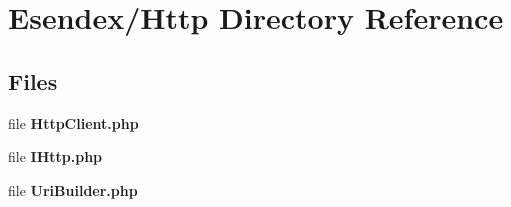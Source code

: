 \section{Esendex/\-Http Directory Reference}
\label{dir_b59bf127e7c1bcef4ca1e517d6fc1685}
\subsection*{Files}
\begin{DoxyCompactItemize}
\item 
file {\bfseries Http\-Client.\-php}
\item 
file {\bfseries I\-Http.\-php}
\item 
file {\bfseries Uri\-Builder.\-php}
\end{DoxyCompactItemize}
